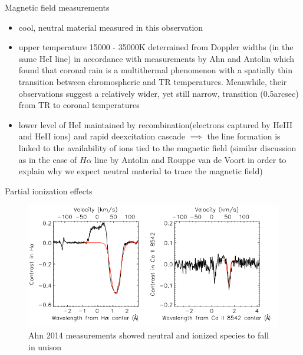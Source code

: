 \documentclass{beamer}
\begin{document}
\begin{frame}{Magnetic field measurements }

\begin{itemize}
\item cool, neutral material measured in this observation
\item upper temperature 15000 - 35000K determined from Doppler widths (in the same HeI line) in accordance with measurements by Ahn
and Antolin which found that coronal rain is a multithermal phenomenon with a spatially
thin transition between chromospheric and TR temperatures.
Meanwhile, their observations suggest a relatively wider, yet
still narrow, transition (0.5arcsec) from TR to coronal
temperatures
\item lower level of HeI maintained by recombination(electrons captured by HeIII and HeII ions) and rapid deexcitation cascade $\implies$
the line formation is linked to the availability of ions tied to the
magnetic field (similar discussion as in the case of $H\alpha$ line by Antolin and Rouppe van de Voort in order to explain 
why we expect neutral material to trace the magnetic field)
\end{itemize}
\end{frame}

\begin{frame}{Partial ionization effects}
\begin{figure}[H]
 \centering
 \includegraphics[scale=0.32]{ahn1.png}
\caption{Ahn 2014 measurements showed neutral
and ionized species to fall in unison}
\end{figure}

\end{frame}
\end{document}

